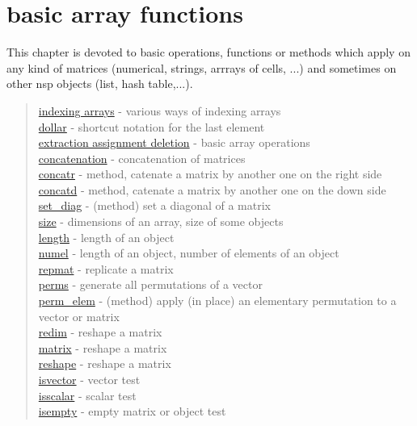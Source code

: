 \chapter*{basic array functions}

\hypertarget{arrays}{}

This chapter is devoted to basic operations, functions or methods which apply on
any kind of matrices (numerical, strings, arrrays of cells, ...) and sometimes
on other nsp objects (list, hash table,...).

\begin{quote}
\noindent
\hyperlink{indexing arrays}{indexing arrays} - various ways of indexing arrays \\
\hyperlink{dollar}{dollar} - shortcut notation for the last element\\
\hyperlink{extraction assignment deletion}{extraction assignment deletion} - basic array operations\\
\hyperlink{concatenation}{concatenation} - concatenation of matrices\\
\hyperlink{concatr}{concatr} - method, catenate a matrix by another one on the right side\\   
\hyperlink{concatd}{concatd} - method, catenate a matrix by another one on the down side\\   
\hyperlink{set_diag}{set\_diag} - (method) set a diagonal of a matrix \\
\hyperlink{size}{size} - dimensions of an array, size of some objects \\
\hyperlink{length}{length} - length of an object  \\
\hyperlink{numel}{numel} - length of an object, number of elements of an object  \\
\hyperlink{repmat}{repmat} - replicate a matrix\\
\hyperlink{perms}{perms} - generate all permutations of a vector\\
\hyperlink{perm_elem}{perm\_elem} - (method) apply (in place) an elementary permutation to a vector or matrix \\
\hyperlink{redim}{redim} - reshape a matrix\\
\hyperlink{matrix}{matrix} - reshape a matrix\\
\hyperlink{reshape}{reshape} - reshape a matrix\\
\hyperlink{isvector}{isvector} - vector test\\
\hyperlink{isscalar}{isscalar} - scalar test\\
\hyperlink{isempty}{isempty} - empty matrix or object test\\
\end{quote}



  







